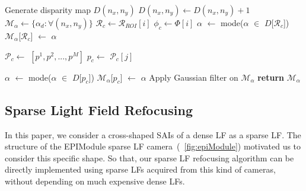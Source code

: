 \begin{algorithm}[!h]
\begin{algorithmic}[1]
    \State Generate disparity map $D(n_x,n_y)$
    \State $D(n_x,n_y) \gets D(n_x,n_y) + 1$ \Comment{~\eqref{eq:disparity}}
    \State $\mathcal{M}_\alpha \gets \{\alpha_d:\forall(n_x,n_y)\}$  %
    \State $\mathcal{R}_{c} \gets \mathcal{R}_{ROI}[i]$
    \State $\phi_{c} \gets \Phi[i]$
            \State $\alpha$ $\gets$ mode($\alpha$ $\in$ $D$[$\mathcal{R}_c$])
            \State $\mathcal{M}_\alpha$[$\mathcal{R}_c$] $\gets$ $\alpha$
        \Else  {}
        
        \State $\mathcal{P}_c \gets$ $[p^1, p^2, ..., p^M]$ 
        \State $p_c \gets$ $\mathcal{P}_c[j]$

                \State $\alpha$ $\gets$ mode($\alpha$ $\in$ $D$[$p_c$])
                \State $\mathcal{M}_\alpha$[$p_c$] $\gets$ $\alpha$
            \EndFor
        \EndIf
    \EndFor
    \State Apply Gaussian filter on $\mathcal{M}_\alpha$
    \State \textbf{return} $\mathcal{M}_\alpha$
\EndProcedure

\end{algorithmic}
\end{algorithm}


\subsection{Sparse Light Field Refocusing}\label{sec:sparse_refocus}

In this paper, we consider a cross-shaped SAIs of a dense LF as a sparse LF. The structure of the EPIModule sparse LF camera~(\figurename~\ref{fig:epiModule}) motivated us to consider this specific shape.
So that, our sparse LF refocusing algorithm can be directly implemented using sparse LFs acquired from this kind of cameras, without depending on much expensive dense LFs.

